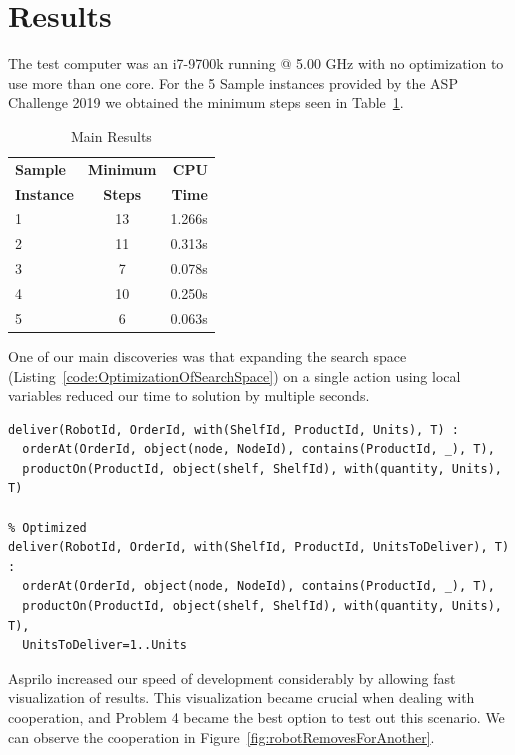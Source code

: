 \documentclass{IEEEtran}
\begin{document}
\section{Results}

The test computer was an i7-9700k running @ 5.00 GHz with no optimization to use more than one core. For the 5 Sample instances provided by the ASP Challenge 2019 we obtained the minimum steps seen in Table~\ref{table:MainResults}. 

\begin{table}[h!]
  \begin{center}
    \caption{Main Results}
    \label{table:MainResults}
    \begin{tabular}{l|c|r}
      \textbf{Sample} & \textbf{Minimum} & \textbf{CPU}\\
      \textbf{Instance} & \textbf{Steps} & \textbf{Time}\\
      \hline
      1 & 13 & 1.266s\\
      2 & 11 & 0.313s\\
      3 & 7 & 0.078s\\
      4 & 10 & 0.250s\\
      5 & 6 & 0.063s\\
    \end{tabular}
  \end{center}
\end{table}

One of our main discoveries was that expanding the search space (Listing~\ref{code:OptimizationOfSearchSpace}) on a single action using local variables reduced our time to solution by multiple seconds.

\begin{lstlisting}[numbers=none,
  label={code:OptimizationOfSearchSpace},
  language=clingo]
% Unoptimized
deliver(RobotId, OrderId, with(ShelfId, ProductId, Units), T) : 
  orderAt(OrderId, object(node, NodeId), contains(ProductId, _), T),
  productOn(ProductId, object(shelf, ShelfId), with(quantity, Units), T)

% Optimized
deliver(RobotId, OrderId, with(ShelfId, ProductId, UnitsToDeliver), T) : 
  orderAt(OrderId, object(node, NodeId), contains(ProductId, _), T),
  productOn(ProductId, object(shelf, ShelfId), with(quantity, Units), T), 
  UnitsToDeliver=1..Units
\end{lstlisting}

Asprilo increased our speed of development considerably by allowing fast visualization of results. This visualization became crucial when dealing with cooperation, and Problem 4 became the best option to test out this scenario. We can observe the cooperation in Figure~\ref{fig:robotRemovesForAnother}.
\end{document}
